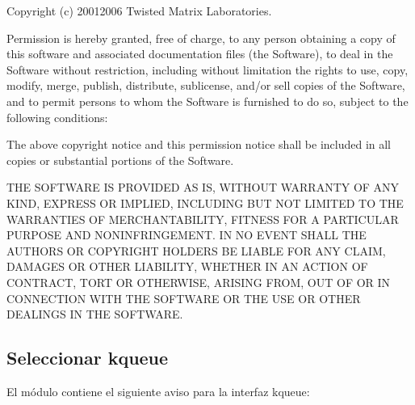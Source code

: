 \documentclass[a4,10pt,spanish]{sphinxmanual}
\begin{document}
\begin{sphinxVerbatim}[commandchars=\\\{\}]
Copyright (c) 2001\PYGZhy{}2006 Twisted Matrix Laboratories.

Permission is hereby granted, free of charge, to any person obtaining
a copy of this software and associated documentation files (the
\PYGZdq{}Software\PYGZdq{}), to deal in the Software without restriction, including
without limitation the rights to use, copy, modify, merge, publish,
distribute, sublicense, and/or sell copies of the Software, and to
permit persons to whom the Software is furnished to do so, subject to
the following conditions:

The above copyright notice and this permission notice shall be
included in all copies or substantial portions of the Software.

THE SOFTWARE IS PROVIDED \PYGZdq{}AS IS\PYGZdq{}, WITHOUT WARRANTY OF ANY KIND,
EXPRESS OR IMPLIED, INCLUDING BUT NOT LIMITED TO THE WARRANTIES OF
MERCHANTABILITY, FITNESS FOR A PARTICULAR PURPOSE AND
NONINFRINGEMENT. IN NO EVENT SHALL THE AUTHORS OR COPYRIGHT HOLDERS BE
LIABLE FOR ANY CLAIM, DAMAGES OR OTHER LIABILITY, WHETHER IN AN ACTION
OF CONTRACT, TORT OR OTHERWISE, ARISING FROM, OUT OF OR IN CONNECTION
WITH THE SOFTWARE OR THE USE OR OTHER DEALINGS IN THE SOFTWARE.
\end{sphinxVerbatim}


\subsection{Seleccionar kqueue}
\label{\detokenize{license:select-kqueue}}
\sphinxAtStartPar
El módulo  contiene el siguiente aviso para la interfaz kqueue:
\end{document}
